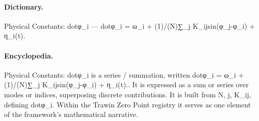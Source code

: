 \paragraph{Dictionary.}
Physical Constants: dotφ\_i — dotφ\_i = ω\_i + (1)/(N)∑\_j K\_ijsin(φ\_j-φ\_i) + η\_i(t).

\paragraph{Encyclopedia.}
Physical Constants: dotφ\_i is a series / summation, written dotφ\_i = ω\_i + (1)/(N)∑\_j K\_ijsin(φ\_j-φ\_i) + η\_i(t).. It is expressed as a sum or series over modes or indices, superposing discrete contributions. It is built from N, j, K\_ij, defining dotφ\_i. Within the Trawin Zero Point registry it serves as one element of the framework's mathematical narrative.
